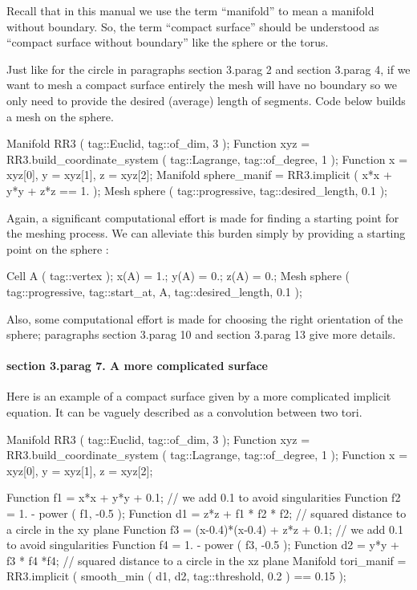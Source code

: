 Recall that in this manual we use the term ``manifold'' to mean a manifold without boundary.
So, the term ``compact surface'' should be understood as ``compact surface without boundary''
like the sphere or the torus.

Just like for the {\codett circle} in paragraphs \numb section 3.\numb parag 2 and
\numb section 3.\numb parag 4,
if we want to mesh a compact surface entirely the mesh will have no boundary so we only need
to provide the desired (average) length of segments.
Code below builds a mesh on the sphere.

\verbatim
   Manifold RR3 ( tag::Euclid, tag::of_dim, 3 );
   Function xyz = RR3.build_coordinate_system ( tag::Lagrange, tag::of_degree, 1 );
   Function x = xyz[0],  y = xyz[1],  z = xyz[2];
   Manifold sphere_manif = RR3.implicit ( x*x + y*y + z*z == 1. );
   Mesh sphere ( tag::progressive, tag::desired_length, 0.1 );
\endverbatim

Again, a significant computational effort is made for finding a starting point
for the meshing process.
We can alleviate this burden simply by providing a starting point on the sphere :

\verbatim
   Cell A ( tag::vertex );  x(A) = 1.;  y(A) = 0.;  z(A) = 0.;
   Mesh sphere ( tag::progressive, tag::start_at, A, tag::desired_length, 0.1 );
\endverbatim

Also, some computational effort is made for choosing the right orientation of the sphere;
paragraphs \numb section 3.\numb parag 10 and \numb section 3.\numb parag 13 give more details.


\paragraph{\numb section 3.\numb parag 7. A more complicated surface}

Here is an example of a compact surface given by a more complicated implicit equation.
It can be vaguely described as a convolution between two tori.

\verbatim
   Manifold RR3 ( tag::Euclid, tag::of_dim, 3 );
   Function xyz = RR3.build_coordinate_system ( tag::Lagrange, tag::of_degree, 1 );
   Function x = xyz[0],  y = xyz[1],  z = xyz[2];

   Function f1 = x*x + y*y + 0.1;  // we add 0.1 to avoid singularities
   Function f2 = 1. - power ( f1, -0.5 );
   Function d1 = z*z + f1 * f2 * f2;  // squared distance to a circle in the xy plane
   Function f3 = (x-0.4)*(x-0.4) + z*z + 0.1;  // we add 0.1 to avoid singularities
   Function f4 = 1. - power ( f3, -0.5 );
   Function d2 = y*y + f3 * f4 *f4;  // squared distance to a circle in the xz plane
   Manifold tori_manif = RR3.implicit
      ( smooth_min ( d1, d2, tag::threshold, 0.2 ) == 0.15 );

